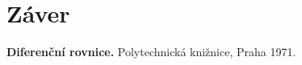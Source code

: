 \documentclass[a4paper,10pt]{article}
\theoremstyle{plain}
\theoremstyle{definition}
\begin{document}
\section{Záver}


\begin{thebibliography}{9}
               {\bf Diferenční rovnice.}
           Polytechnická knižnice, Praha 1971.
\end{thebibliography}
\end{document}
